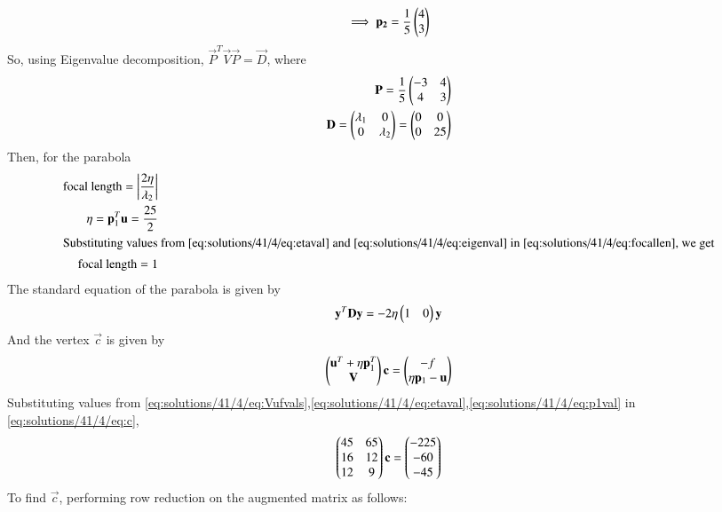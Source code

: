 \begin{align}
    \implies\mathbf{p_2}=\frac{1}{5}\begin{pmatrix}4\\3\end{pmatrix}\label{eq:solutions/41/4/eq:p2val}
\end{align}
So, using Eigenvalue decomposition, $\vec{P}^T\vec{V}\vec{P}=\vec{D}$, where
\begin{align}
    \mathbf{P} = \frac{1}{5}\begin{pmatrix}-3 & 4\\4 & 3\end{pmatrix}\\
    \mathbf{D} = \begin{pmatrix}\lambda_1 & 0\\0 & \lambda_2\end{pmatrix} = \begin{pmatrix}0 & 0\\ 0 & 25\end{pmatrix}
\end{align}
Then, for the parabola
\begin{align}
    \text{focal length} = \left\vert\frac{2\eta}{\lambda_2}\right\vert \label{eq:solutions/41/4/eq:focallen}\\
    \eta = \mathbf{p}_1^T\mathbf{u} = \frac{25}{2}\label{eq:solutions/41/4/eq:etaval}\\
    \intertext{Substituting values from \eqref{eq:solutions/41/4/eq:etaval} and \eqref{eq:solutions/41/4/eq:eigenval} in \eqref{eq:solutions/41/4/eq:focallen}, we get}
    \text{focal length} = 1
\end{align}
The standard equation of the parabola is given by
\begin{align}
    \mathbf{y}^T\mathbf{D}\mathbf{y} = -2\eta\begin{pmatrix}1 & 0\end{pmatrix}\mathbf{y}
\end{align}
And the vertex $\vec{c}$ is given by
\begin{align}
    \begin{pmatrix}\mathbf{u}^T + \eta\mathbf{p}_1^T \\ \mathbf{V}\end{pmatrix}\mathbf{c} = \begin{pmatrix}-f \\ \eta\mathbf{p}_1 - \mathbf{u}\end{pmatrix} \label{eq:solutions/41/4/eq:c}
\end{align}
Substituting values from \eqref{eq:solutions/41/4/eq:Vufvals},\eqref{eq:solutions/41/4/eq:etaval},\eqref{eq:solutions/41/4/eq:p1val} in \eqref{eq:solutions/41/4/eq:c},
\begin{align}
    \begin{pmatrix}45 & 65\\16 & 12\\12 & 9\end{pmatrix}\mathbf{c} = \begin{pmatrix}-225\\-60\\-45\end{pmatrix}
\end{align}
To find $\vec{c}$, performing row reduction on the augmented matrix as follows:
